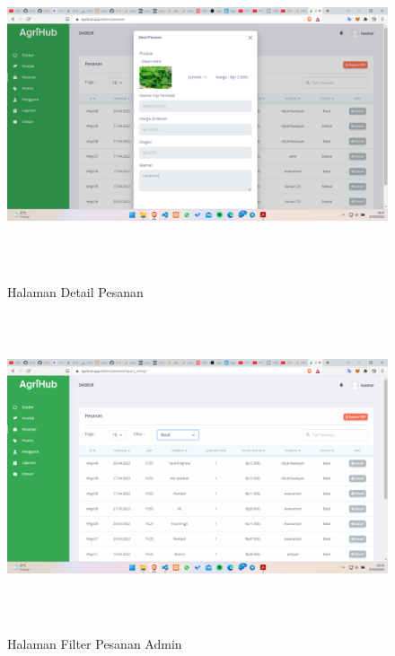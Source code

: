 \begin{enumerate}
\begin{enumerate}
			\begin{figure}[H]
				\centering
				{\includegraphics [width = 14.3cm, height= 9cm]{gambar/admin/detail_pesanan}}
				\caption{Halaman Detail Pesanan}
				\label{detail_pesanan}
			\end{figure}

			\begin{figure}[H]
				\centering
				{\includegraphics [width = 14.3cm, height= 9cm]{gambar/admin/filter_pesanan_admin}}
				\caption{Halaman Filter Pesanan Admin}
				\label{filter_pesanan_admin}
			\end{figure}


\end{enumerate}
\end{enumerate}
